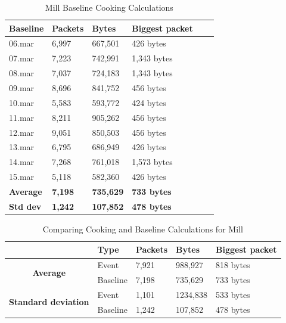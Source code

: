 \begin{table}[H]
    \centering
    \caption{Mill Baseline Cooking Calculations}
    \begin{tabular}{|l|l|l|l|l|l|}
    \hline
        \textbf{Baseline} & \textbf{Packets} & \textbf{Bytes} & \textbf{Biggest packet} \\ \hline
        06.mar & 6,997 & 667,501 & 426 bytes \\ \hline
        07.mar & 7,223 & 742,991 & 1,343 bytes \\ \hline
        08.mar & 7,037 & 724,183 & 1,343 bytes \\ \hline
        09.mar & 8,696 & 841,752 & 456 bytes \\ \hline
        10.mar & 5,583 & 593,772 & 424 bytes \\ \hline
        11.mar & 8,211 & 905,262 & 456 bytes \\ \hline
        12.mar & 9,051 & 850,503 & 456 bytes \\ \hline
        13.mar & 6,795 & 686,949 & 426 bytes \\ \hline
        14.mar & 7,268 & 761,018 & 1,573 bytes \\ \hline
        15.mar & 5,118 & 582,360 & 426 bytes \\ \hline
        \textbf{Average} &  \textbf{7,198}  &  \textbf{735,629}  &  \textbf{733 bytes} \\ \hline
        \textbf{Std dev}  &  \textbf{1,242}   &  \textbf{107,852}   &  \textbf{478 bytes} \\ \hline
    \end{tabular}
    \label{tab:MillBaselineCookingCalculations}
\end{table}

\begin{table}[H]
    \centering
    \caption{Comparing Cooking and Baseline Calculations for Mill}
    \begin{tabular}{c|l|l|l|l|}
        \cline{2-5}
        \multicolumn{1}{l|}{}                                              & \textbf{Type} & \textbf{Packets} & \textbf{Bytes} & \textbf{Biggest packet} \\ \hline
        \multicolumn{1}{|c|}{\multirow{2}{*}{\textbf{Average}}}            & Event         & 7,921              & 988,927        & 818 bytes               \\ \cline{2-5} 
        \multicolumn{1}{|c|}{}                                             & Baseline      & 7,198              & 735,629         & 733 bytes                \\ \hline
        \multicolumn{1}{|c|}{\multirow{2}{*}{\textbf{Standard deviation}}} & Event         & 1,101              & 1234,838         & 533 bytes                 \\ \cline{2-5} 
        \multicolumn{1}{|c|}{}                                             & Baseline      & 1,242               & 107,852        &  478 bytes               \\ \hline          
    \end{tabular}
    \label{tab:MillComparingBaselineAndCookingCalculations}
\end{table}


